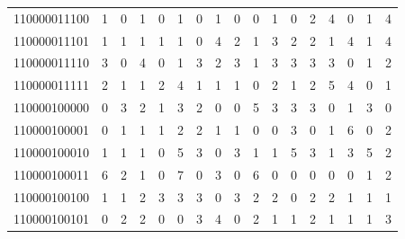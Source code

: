\documentclass[10pt,a4paper]{article}
\begin{document}
\begin{longtable}{ |c|c|c|c|c|c|c|c|c|c|c|c|c|c|c|c|c| }
    110000011100              & 1                            & 0                                & 1                            & 0                              & 1   & 0   & 1   & 0   & 0   & 1   & 0   & 2   & 4   & 0   & 1   & 4   \\
    110000011101              & 1                            & 1                                & 1                            & 1                              & 1   & 0   & 4   & 2   & 1   & 3   & 2   & 2   & 1   & 4   & 1   & 4   \\
    110000011110              & 3                            & 0                                & 4                            & 0                              & 1   & 3   & 2   & 3   & 1   & 3   & 3   & 3   & 3   & 0   & 1   & 2   \\
    110000011111              & 2                            & 1                                & 1                            & 2                              & 4   & 1   & 1   & 1   & 0   & 2   & 1   & 2   & 5   & 4   & 0   & 1   \\
    110000100000              & 0                            & 3                                & 2                            & 1                              & 3   & 2   & 0   & 0   & 5   & 3   & 3   & 3   & 0   & 1   & 3   & 0   \\
    110000100001              & 0                            & 1                                & 1                            & 1                              & 2   & 2   & 1   & 1   & 0   & 0   & 3   & 0   & 1   & 6   & 0   & 2   \\
    110000100010              & 1                            & 1                                & 1                            & 0                              & 5   & 3   & 0   & 3   & 1   & 1   & 5   & 3   & 1   & 3   & 5   & 2   \\
    110000100011              & 6                            & 2                                & 1                            & 0                              & 7   & 0   & 3   & 0   & 6   & 0   & 0   & 0   & 0   & 0   & 1   & 2   \\
    110000100100              & 1                            & 1                                & 2                            & 3                              & 3   & 3   & 0   & 3   & 2   & 2   & 0   & 2   & 2   & 1   & 1   & 1   \\
    110000100101              & 0                            & 2                                & 2                            & 0                              & 0   & 3   & 4   & 0   & 2   & 1   & 1   & 2   & 1   & 1   & 1   & 3   \\

\end{longtable}
\end{document}
